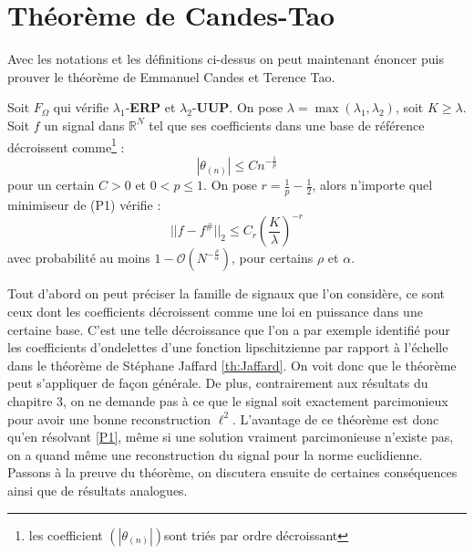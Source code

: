\section{Théorème de Candes-Tao}
Avec les notations et les définitions ci-dessus on peut maintenant énoncer puis prouver le théorème de Emmanuel Candes et Terence Tao.
\begin{theoreme}
	Soit $F_\Omega$ qui vérifie $\lambda_1$-\textbf{ERP} et $\lambda_2$-\textbf{UUP}.
	On pose $\lambda = \max(\lambda_1, \lambda_2)$, soit $K\geq \lambda$.
	\newline
	Soit $f$ un signal dans $\mathbb{R}^N$ tel que ses coefficients dans une base de référence décroissent comme\footnote{les coefficient $(|\theta_{(n)}|)$sont triés par ordre décroissant} :
	\begin{equation}\label{eq:ineqtheta}
		|\theta_{(n)}| \leq C n^{-\frac{1}{p}}
	\end{equation}
	pour un certain $C >0$ et $0 < p \leq 1$. 
	\newline
	On pose $r = \frac{1}{p} - \frac{1}{2}$, alors n'importe quel minimiseur de (P1) vérifie :
	\begin{equation}
		||f - f^\#||_2 \leq C_r (\frac{K}{\lambda})^{-r}
	\end{equation}
	avec probabilité au moins $1 - \mathcal{O}(N^{-\frac{\rho}{\alpha}})$, pour certains $\rho$ et $\alpha$.
\end{theoreme}
Tout d'abord on peut préciser la famille de signaux que l'on considère, ce sont ceux dont les coefficients décroissent comme une loi en puissance dans une certaine base. 
C'est une telle décroissance que l'on a par exemple identifié pour les coefficients d'ondelettes d'une fonction lipschitzienne par rapport à l'échelle dans le théorème de Stéphane Jaffard \ref{th:Jaffard}.
On voit donc que le théorème peut s'appliquer de façon générale.
De plus, contrairement aux résultats du chapitre 3, on ne demande pas à ce que le signal soit exactement parcimonieux pour avoir une bonne reconstruction $\ell^2$.
L'avantage de ce théorème est donc qu'en résolvant \ref{P1}, même si une solution vraiment parcimonieuse n'existe pas, on a quand même une reconstruction du signal pour la norme euclidienne.
\newline
Passons à la preuve du théorème, on discutera ensuite de certaines conséquences ainsi que de résultats analogues.
